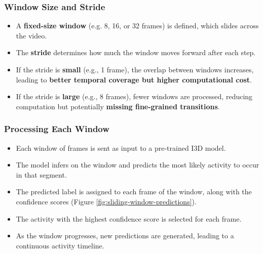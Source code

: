 \documentclass{article}
\begin{document}
\subsubsection{Window Size and Stride}
\begin{itemize}
    \item A \textbf{fixed-size window} (e.g. 8, 16, or 32 frames) is defined, which slides across the video.
    \item The \textbf{stride} determines how much the window moves forward after each step.
    \item If the stride is \textbf{small} (e.g., 1 frame), the overlap between windows increases, leading to \textbf{better temporal coverage but higher computational cost}.
    \item If the stride is \textbf{large} (e.g., 8 frames), fewer windows are processed, reducing computation but potentially \textbf{missing fine-grained transitions}.
\end{itemize}

\subsubsection{Processing Each Window}
\begin{itemize}
    \item Each window of frames is sent as input to a pre-trained I3D model.
    \item The model infers on the window and predicts the most likely activity to occur in that segment.
    \item The predicted label is assigned to each frame of the window, along with the confidence scores (Figure \ref{fig:sliding-window-predictions}).
    \item The activity with the highest confidence score is selected for each frame.
    \item As the window progresses, new predictions are generated, leading to a continuous activity timeline.
\end{itemize}
\end{document}
